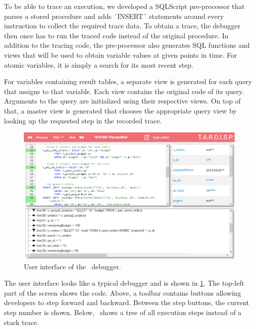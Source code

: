 
To be able to trace an execution, we developed a SQLScript pre-processor that parses a stored procedure and adds ´INSERT´ statements around every instruction to collect the required trace data.
To obtain a trace, the debugger then once has to run the traced code instead of the original procedure.
In addition to the tracing code, the pre-processor also generates SQL functions and views that will be used to obtain variable values at given points in time.
For atomic variables, it is simply a search for its most recent step.

For variables containing result tables, a separate view is generated for each query that assigns to that variable.
Each view contains the original code of its query.
Arguments to the query are initialized using their respective views.
On top of that, a master view is generated that chooses the appropriate query view by looking up the requested step in the recorded trace.

\begin{figure}
	\centering
		\includegraphics[width=\linewidth]{img/odb.png}
	\caption{User interface of the \tool\ debugger.}
	\label{fig:odb}
\end{figure}

The user interface looks like a typical debugger and is shown in \cref{fig:odb}.
The top-left part of the screen shows the code.
Above, a toolbar contains buttons allowing developers to step forward and backward.
Between the step buttons, the current step number is shown.
Below, \tool\ shows a tree of all execution steps instead of a stack trace.

